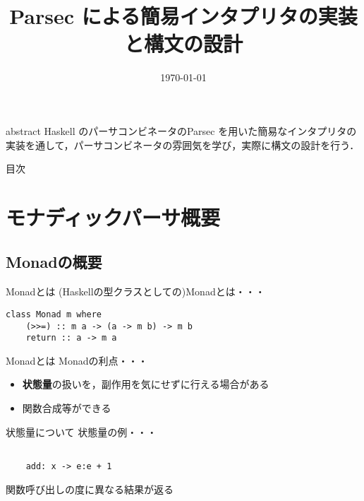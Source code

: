 \documentclass[uplatex,dvipdfmx,ja=standard]{beamer}
\begin{document}
%
%
\title[Midterm Presentation]{Parsec による簡易インタプリタの実装と構文の設計} 
\date{\today}

\begin{frame}
\titlepage 
\end{frame}

\begin{frame}{abstract}
    Haskell のパーサコンビネータのParsec を用いた簡易なインタプリタの実装を通して，パーサコンビネータの雰囲気を学び，実際に構文の設計を行う．
\end{frame}

\begin{frame}{目次}
    \tableofcontents
\end{frame}

\section{モナディックパーサ概要}
\subsection{Monadの概要}
\begin{frame}[fragile]{Monadとは}
    (Haskellの型クラスとしての)Monadとは・・・
    \begin{lstlisting}[]
    class Monad m where 
    (>>=) :: m a -> (a -> m b) -> m b 
    return :: a -> m a
    \end{lstlisting}
\end{frame}

\begin{frame}{Monadとは}
    Monadの利点・・・
    \begin{itemize}
        \item \textbf{状態量}の扱いを，副作用を気にせずに行える場合がある
        \item 関数合成等ができる
    \end{itemize}
\end{frame}

\begin{frame}[fragile]{状態量について}
    状態量の例・・・
    \begin{verbatim}
    
    add: x -> e:e + 1

    \end{verbatim}

    関数呼び出しの度に異なる結果が返る
\end{frame}
\end{document}
